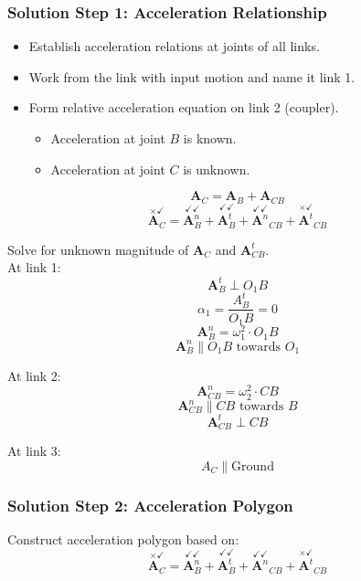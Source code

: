 \documentclass[11pt]{article}
\begin{document}
 \newpage
\subsubsection{Solution Step 1: Acceleration Relationship}
\label{sec:orgeeaee55}
\begin{itemize}
\item Establish acceleration relations at joints of all links.
\item Work from the link with input motion and name it link 1.
\item Form relative acceleration equation on link 2 (coupler).
\begin{itemize}
\item Acceleration at joint \(B\) is known.
\item Acceleration at joint \(C\) is unknown.
\end{itemize}
\end{itemize}
\[\boldsymbol{A}_C = \boldsymbol{A}_B + \boldsymbol{A}_{CB}\]
\[\overset{\times \checkmark}{\boldsymbol{A}_C} = \overset{\checkmark \checkmark}{\boldsymbol{A}_B^n} + \overset{\checkmark \checkmark}{\boldsymbol{A}_B^t} + \overset{\checkmark \checkmark}{\boldsymbol{A}^n}_{CB} + \overset{\times \checkmark}{\boldsymbol{A}^t}_{CB}\]

Solve for unknown magnitude of \(\boldsymbol{A}_C\) and \(\boldsymbol{A}_{CB}^t\).  \\

At link 1:
\[\boldsymbol{A}_B^t \perp O_1 B\]
\[\alpha_1 = \frac{A_B^t}{O_1 B} = 0\]
\[\boldsymbol{A}_B^n = \omega_1^2 \cdot O_1 B\]
\[\boldsymbol{A}_B^n \parallel O_1 B \text{ towards } O_1\]

At link 2:
\[\boldsymbol{A}_{CB}^n = \omega_2^2 \cdot CB\]
\[\boldsymbol{A}_{CB}^n \parallel CB \text{ towards } B\]
\[\boldsymbol{A}_{CB}^t \perp CB\]

At link 3:
\[A_C \parallel \text{Ground}\]

 \newpage
\subsubsection{Solution Step 2: Acceleration Polygon}
\label{sec:org181aa94}
Construct acceleration polygon based on:
\[\overset{\times \checkmark}{\boldsymbol{A}_C} = \overset{\checkmark \checkmark}{\boldsymbol{A}_B^n} + \overset{\checkmark \checkmark}{\boldsymbol{A}_B^t} + \overset{\checkmark \checkmark}{\boldsymbol{A}^n}_{CB} + \overset{\times \checkmark}{\boldsymbol{A}^t}_{CB}\]
\end{document}
